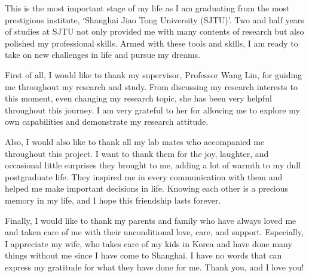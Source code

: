 \begin{thanks}
	
This is the most important stage of my life as I am graduating from the most prestigious institute, `Shanghai Jiao Tong University (SJTU)'. Two and half years of studies at SJTU not only provided me with many contents of research but also polished my professional skills. Armed with these tools and skills, I am ready to take on new challenges in life and pursue my dreams.

First of all, I would like to thank my supervisor, Professor Wang Lin, for guiding me throughout my research and study. From discussing my research interests to this moment, even changing my research topic, she has been very helpful throughout this journey. I am very grateful to her for allowing me to explore my own capabilities and demonstrate my research attitude.

Also, I would also like to thank all my lab mates who accompanied me throughout this project. I want to thank them for the joy, laughter, and occasional little surprises they brought to me, adding a lot of warmth to my dull postgraduate life. They inspired me in every communication with them and helped me make important decisions in life. Knowing each other is a precious memory in my life, and I hope this friendship lasts forever.

Finally, I would like to thank my parents and family who have always loved me and taken care of me with their unconditional love, care, and support. Especially, I appreciate my wife, who takes care of my kids in Korea and have done many things without me since I have come to Shanghai. I have no words that can express my gratitude for what they have done for me. Thank you, and I love you!

\end{thanks}
